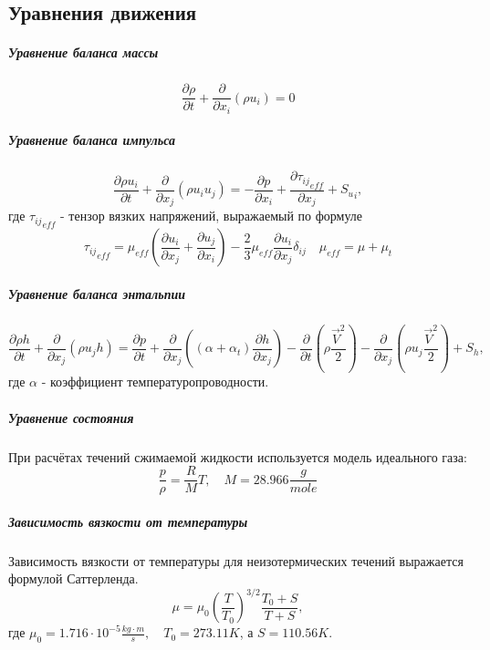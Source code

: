 \subsection{Уравнения движения}
		\subparagraph{Уравнение баланса массы\\}
			\begin{equation}
				\frac{\partial \rho}{\partial t} + \frac{\partial}{\partial x_i}(\rho u_i) = 0
			\end{equation}
		\subparagraph{Уравнение баланса импульса\\}
			\begin{equation}
				\frac{\partial \rho u_i}{\partial t} + \frac{\partial}{\partial x_j}(\rho u_iu_j) = - \frac{\partial p}{\partial x_i} + \frac{\partial {\tau_{ij}}_{eff}}{\partial x_j} + {S_u}_i,
				\label{flowEqn}
			\end{equation}
			где ${\tau_{ij}}_{eff}$ - тензор вязких напряжений, выражаемый по формуле
			\begin{equation}
				{\tau_{ij}}_{eff} = \mu_{eff}\left( \frac{\partial u_i}{\partial x_j} + \frac{\partial u_j}{\partial x_i} \right) - \frac{2}{3}\mu_{eff}\frac{\partial u_i}{\partial x_j} \delta_{ij} \quad \mu_{eff} = \mu + \mu_{t}
			\end{equation}
		\subparagraph{Уравнение баланса энтальпии\\}
		\begin{equation}
			\frac{\partial \rho h}{\partial t} + \frac{\partial}{\partial x_j} (\rho u_j h) = \frac{\partial p}{\partial t} + \frac{\partial}{\partial x_j} \left((\alpha + \alpha_t) \frac{\partial h}{\partial x_j}\right) - \frac{\partial}{\partial t}\left(\rho \frac{\vec{V}^2}{2}\right) - \frac{\partial}{\partial x_j}\left(\rho u_j \frac{\vec{V}^2}{2}\right) + S_h,
			\label{thermoEqn}
		\end{equation}
		 где $\alpha$ - коэффициент температуропроводности.
		\subparagraph{Уравнение состояния\\}
			\hspace{2em}При расчётах течений сжимаемой жидкости используется модель идеального газа:
			\begin{equation}
				\frac{p}{\rho} = \frac{R}{M}T, \quad M = 28.966 \frac{g}{mole}
			\end{equation}
		\subparagraph{Зависимость вязкости от температуры\\}
				\hspace{2em}Зависимость вязкости от температуры для неизотермических течений выражается формулой Саттерленда.
				\begin{equation}
					\mu = \mu_0 \left(\frac{T}{T_0}\right)^{3/2} \frac{T_0 + S}{T + S},
				\end{equation}
					где $\mu_0 = 1.716 \cdot 10^{-5} \frac{kg \cdot m}{s}, \quad T_0 = 273.11 K$, а $S=110.56 K$.
					
